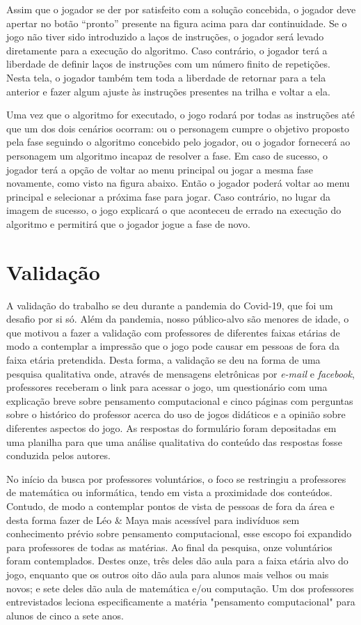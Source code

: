 \documentclass[conference]{IEEEtran}
\begin{document}
Assim que o jogador se der por satisfeito com a solução concebida, o jogador deve apertar no botão ``pronto'' presente na figura acima para dar continuidade. Se o jogo não tiver sido introduzido a laços de instruções, o jogador será levado diretamente para a execução do algoritmo. Caso contrário, o jogador terá a liberdade de definir laços de instruções com um número finito de repetições. Nesta tela, o jogador também tem toda a liberdade de retornar para a tela anterior e fazer algum ajuste às instruções presentes na trilha e voltar a ela.

Uma vez que o algoritmo for executado, o jogo rodará por todas as instruções até que um dos dois cenários ocorram: ou o personagem cumpre o objetivo proposto pela fase seguindo o algoritmo concebido pelo jogador, ou o jogador fornecerá ao personagem um algoritmo incapaz de resolver a fase. Em caso de sucesso, o jogador terá a opção de voltar ao menu principal ou jogar a mesma fase novamente, como visto na figura abaixo. Então o jogador poderá voltar ao menu principal e selecionar a próxima fase para jogar. Caso contrário, no lugar da imagem de sucesso, o jogo explicará o que aconteceu de errado na execução do algoritmo e permitirá que o jogador jogue a fase de novo.

\section{Validação}

A validação do trabalho se deu durante a pandemia do Covid-19, que foi um desafio por si só. Além da pandemia, nosso público-alvo são menores de idade, o que motivou a fazer a validação com professores de diferentes faixas etárias de modo a contemplar a impressão que o jogo pode causar em pessoas de fora da faixa etária pretendida. Desta forma, a validação se deu na forma de uma pesquisa qualitativa onde, através de mensagens eletrônicas por \textit{e-mail} e \textit{facebook}, professores receberam o link para acessar o jogo, um questionário com uma explicação breve sobre pensamento computacional e cinco páginas com perguntas sobre o histórico do professor acerca do uso de jogos didáticos e a opinião sobre diferentes aspectos do jogo. As respostas do formulário foram depositadas em uma planilha para que uma análise qualitativa do conteúdo das respostas fosse conduzida pelos autores.

No início da busca por professores voluntários, o foco se restringiu a professores de matemática ou informática, tendo em vista a proximidade dos conteúdos. Contudo, de modo a contemplar pontos de vista de pessoas de fora da área e desta forma fazer de Léo \& Maya mais acessível para indivíduos sem conhecimento prévio sobre pensamento computacional, esse escopo foi expandido para professores de todas as matérias. Ao final da pesquisa, onze voluntários foram contemplados. Destes onze, três deles dão aula para a faixa etária alvo do jogo, enquanto que os outros oito dão aula para alunos mais velhos ou mais novos; e sete deles dão aula de matemática e/ou computação. Um dos professores entrevistados leciona especificamente a matéria "pensamento computacional" para alunos de cinco a sete anos.
\end{document}
